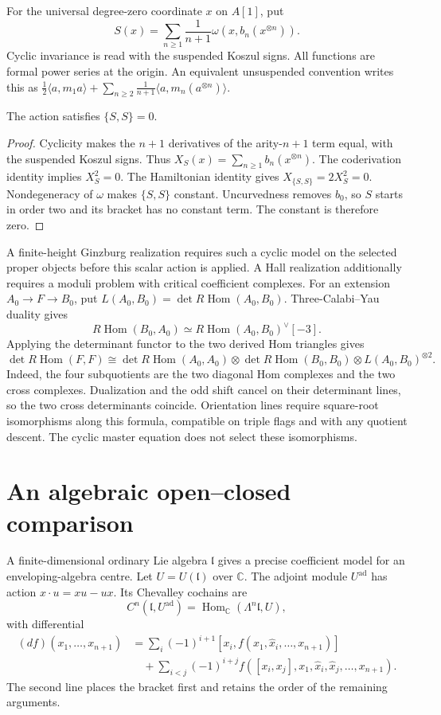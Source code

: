 For the universal degree-zero coordinate $x$ on $A[1]$, put
\[
 S(x)=\sum_{n\ge1}\frac1{n+1}\omega(x,b_n(x^{\otimes n})).
\]
Cyclic invariance is read with the suspended Koszul signs.
All functions are formal power series at the origin.
An equivalent unsuspended convention writes this as
$\frac12\langle a,m_1a\rangle+
\sum_{n\ge2}\frac1{n+1}\langle a,m_n(a^{\otimes n})\rangle$.

\begin{proposition}\label{cyiv:cyclic-master}
The action satisfies $\{S,S\}=0$.
\end{proposition}
\begin{proof}
Cyclicity makes the $n+1$ derivatives of the arity-$n+1$ term equal,
with the suspended Koszul signs.
Thus $X_S(x)=\sum_{n\ge1}b_n(x^{\otimes n})$.
The coderivation identity implies $X_S^2=0$.
The Hamiltonian identity gives $X_{\{S,S\}}=2X_S^2=0$.
Nondegeneracy of $\omega$ makes $\{S,S\}$ constant.
Uncurvedness removes $b_0$, so $S$ starts in order two and its bracket
has no constant term.
The constant is therefore zero.
\end{proof}

A finite-height Ginzburg realization requires such a cyclic model on
the selected proper objects before this scalar action is applied.
A Hall realization additionally requires a moduli problem with
critical coefficient complexes.
For an extension $A_0\to F\to B_0$, put
$L(A_0,B_0)=\det R\operatorname{Hom}(A_0,B_0)$.
Three-Calabi--Yau duality gives
\[
 R\operatorname{Hom}(B_0,A_0)
 \simeq R\operatorname{Hom}(A_0,B_0)^\vee[-3].
\]
Applying the determinant functor to the two derived Hom triangles gives
\[
 \det R\operatorname{Hom}(F,F)
 \cong \det R\operatorname{Hom}(A_0,A_0)
 \otimes\det R\operatorname{Hom}(B_0,B_0)
 \otimes L(A_0,B_0)^{\otimes2}.
\]
Indeed, the four subquotients are the two diagonal Hom complexes and
the two cross complexes.
Dualization and the odd shift cancel on their determinant lines,
so the two cross determinants coincide.
Orientation lines require square-root isomorphisms along this formula,
compatible on triple flags and with any quotient descent.
The cyclic master equation does not select these isomorphisms.

\section{An algebraic open--closed comparison}
A finite-dimensional ordinary Lie algebra $\mathfrak l$ gives a
precise coefficient model for an enveloping-algebra centre.
Let $U=U(\mathfrak l)$ over $\mathbb C$.
The adjoint module $U^{\mathrm{ad}}$ has action
$x\cdot u=xu-ux$.
Its Chevalley cochains are
\[
 C^n(\mathfrak l,U^{\mathrm{ad}})
 =\operatorname{Hom}_{\mathbb C}(\Lambda^n\mathfrak l,U),
\]
with differential
\[
\begin{split}
 (df)(x_1,\ldots,x_{n+1})
 &=\sum_i(-1)^{i+1}[x_i,f(x_1,\widehat x_i,\ldots,x_{n+1})]\\
 &\quad+\sum_{i<j}(-1)^{i+j}
 f([x_i,x_j],x_1,\widehat x_i,\widehat x_j,\ldots,x_{n+1}).
\end{split}
\]
The second line places the bracket first and retains the order of the
remaining arguments.

